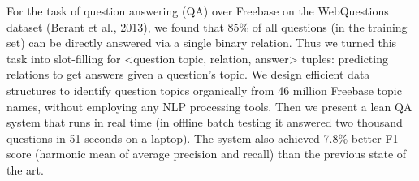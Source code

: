For the task of question answering (QA) over Freebase on the WebQuestions dataset (Berant et al., 2013), we found that 85\% of all questions (in the training set) can be directly answered via a single binary relation. Thus we turned this task into slot-filling for <question topic, relation, answer> tuples: predicting relations to get answers given a question's topic. We design efficient data structures to identify question topics organically from 46 million Freebase topic names, without employing any NLP processing tools. Then we present a lean QA system that runs in real time (in offline batch testing it answered two thousand questions in 51 seconds on a laptop). The system also achieved 7.8\% better F1 score (harmonic mean of average precision and recall) than the previous state of the art.
